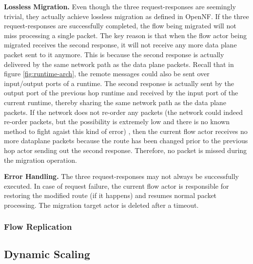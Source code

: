 \textbf{Lossless Migration.} Even though the three request-responses are seemingly trivial, they actually achieve lossless migration as defined in OpenNF. If the three request-responses are successfully completed, the flow being migrated will not miss processing a single packet. The key reason is that when the flow actor being migrated receives the second response, it will not receive any more data plane packet sent to it anymore. This is because the second response is actually delivered by the same network path as the data plane packets. Recall that in figure \ref{fig:runtime-arch}, the remote messages could also be sent over input/output ports of a runtime. The second response is actually sent by the output port of the previous hop runtime and received by the input port of the current runtime, thereby sharing the same network path as the data plane packets. If the network does not re-order any packets (the network could indeed re-order packets, but the possibility is extremely low and there is no known method to fight agaist this kind of error) , then the current flow actor receives no more dataplane packets because the route has been changed prior to the previous hop actor sending out the second response. Therefore, no packet is missed during the migration operation.

\textbf{Error Handling.} The three request-responses may not always be successfully executed. In case of request failure, the current flow actor is responsible for restoring the modified route (if it happens) and resumes normal packet processing. The migration target actor is deleted after a timeout.



\subsubsection{Flow Replication}

\subsection{Dynamic Scaling}

